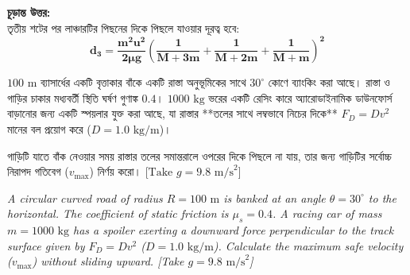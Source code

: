 \documentclass[12pt, a4paper]{article}
\begin{document}
\begin{tcolorbox}[solutionbox={সমাধান (Solution)}]
\vspace{1em}
\begin{tcolorbox}[answerbox]
\textbf{চূড়ান্ত উত্তর:} \\
তৃতীয় শটের পর লাঞ্চারটির পিছনের দিকে পিছলে যাওয়ার দূরত্ব হবে:
\[ \mathbf{d_3 = \frac{m^2 u^2}{2\mu g} \left( \frac{1}{M + 3m} + \frac{1}{M + 2m} + \frac{1}{M + m} \right)^2} \]
\end{tcolorbox}
\end{tcolorbox}

\begin{tcolorbox}[questionbox={প্রশ্ন (Question) 12}]
\noindent
$100\text{ m}$ ব্যাসার্ধের একটি বৃত্তাকার বাঁকে একটি রাস্তা অনুভূমিকের সাথে $30^\circ$ কোণে ব্যাংকিং করা আছে। রাস্তা ও গাড়ির চাকার মধ্যবর্তী স্থিতি ঘর্ষণ গুণাঙ্ক $0.4$। $1000\text{ kg}$ ভরের একটি রেসিং কারে অ্যারোডাইনামিক ডাউনফোর্স বাড়ানোর জন্য একটি স্পয়লার যুক্ত করা আছে, যা রাস্তার **তলের সাথে লম্বভাবে নিচের দিকে** $F_D = D v^2$ মানের বল প্রয়োগ করে ($D = 1.0\text{ kg/m}$)। 

\vspace{0.3em}
\noindent
গাড়িটি যাতে বাঁক নেওয়ার সময় রাস্তার তলের সমান্তরালে ওপরের দিকে পিছলে না যায়, তার জন্য গাড়িটির সর্বোচ্চ নিরাপদ গতিবেগ ($v_{\text{max}}$) নির্ণয় করো। [$\text{Take } g = 9.8\text{ m/s}^2$]

\vspace{0.8em}
\begin{english}
\noindent\textit{\color{darkgray}
A circular curved road of radius $R = 100\text{ m}$ is banked at an angle $\theta = 30^\circ$ to the horizontal. The coefficient of static friction is $\mu_s = 0.4$. A racing car of mass $m = 1000\text{ kg}$ has a spoiler exerting a downward force perpendicular to the track surface given by $F_D = Dv^2$ ($D = 1.0\text{ kg/m}$). Calculate the maximum safe velocity ($v_{\text{max}}$) without sliding upward. [Take $g = 9.8\text{ m/s}^2$]
}
\end{english}
\end{tcolorbox}
\end{document}
